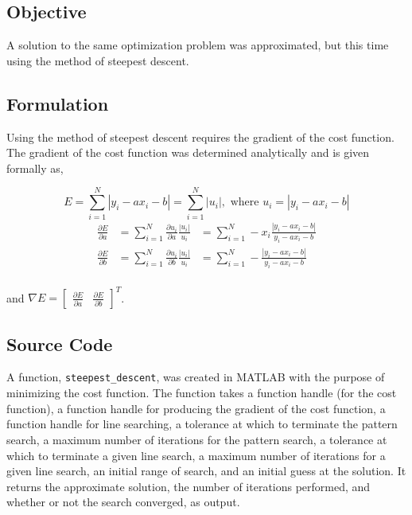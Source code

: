 \documentclass{article}
\begin{document}
\subsection{Objective}

A solution to the same optimization problem was approximated, but this time using the method of steepest descent.

\subsection{Formulation}

Using the method of steepest descent requires the gradient of the cost function.
The gradient of the cost function was determined analytically and is given formally as,

\begin{equation*}
E = \sum_{i=1}^{N} |y_i - ax_i - b| =  \sum_{i=1}^{N} |u_i|, \text{ where } u_i = |y_i - ax_i - b|
\end{equation*}
\begin{eqnarray*}
\frac{\partial E}{\partial a} &= \sum_{i=1}^{N} \frac{\partial u_i}{\partial a} \frac{|u_i|}{u_i} &=  \sum_{i=1}^{N} -x_i \frac{|y_i - ax_i - b|}{y_i - ax_i - b} \\
\frac{\partial E}{\partial b} &= \sum_{i=1}^{N} \frac{\partial u_i}{\partial b} \frac{|u_i|}{u_i} &=  \sum_{i=1}^{N} - \frac{|y_i - ax_i - b|}{y_i - ax_i - b} \\
\end{eqnarray*}

and $\nabla E = \begin{bmatrix} \frac{\partial E}{\partial a} & \frac{\partial E}{\partial b} \end{bmatrix}^T$.

\subsection{Source Code}

A function, \texttt{steepest\_descent}, was created in MATLAB with the purpose of minimizing the cost function.
The function takes a function handle (for the cost function), a function handle for producing the gradient of the cost function, a function handle for line searching, a tolerance at which to terminate the pattern search, a maximum number of iterations for the pattern search, a tolerance at which to terminate a given line search, a maximum number of iterations for a given line search, an initial range of search, and an initial guess at the solution.
It returns the approximate solution, the number of iterations performed, and whether or not the search converged, as output.
\end{document}
